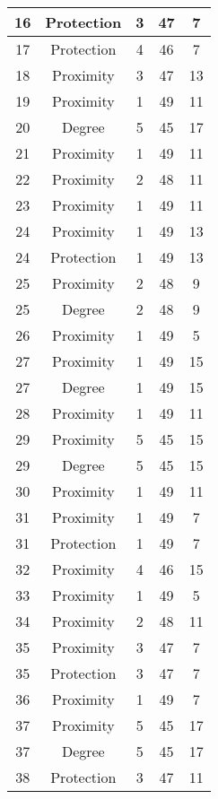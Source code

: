 \documentclass[results.tex]{subfiles}
\begin{document}
\begin{center}
\begin{tabular}{| c || c | c | c | c |}
    16 & Protection & 3 & 47 & 7 \\ 
    \hline
    17 & Protection & 4 & 46 & 7 \\ 
    \hline
    18 & Proximity & 3 & 47 & 13 \\ 
    \hline
    19 & Proximity & 1 & 49 & 11 \\ 
    \hline
    20 & Degree & 5 & 45 & 17 \\ 
    \hline
    21 & Proximity & 1 & 49 & 11 \\ 
    \hline
    22 & Proximity & 2 & 48 & 11 \\ 
    \hline
    23 & Proximity & 1 & 49 & 11 \\ 
    \hline
    24 & Proximity & 1 & 49 & 13 \\ 
    \hline
    24 & Protection & 1 & 49 & 13 \\ 
    \hline
    25 & Proximity & 2 & 48 & 9 \\ 
    \hline
    25 & Degree & 2 & 48 & 9 \\ 
    \hline
    26 & Proximity & 1 & 49 & 5 \\ 
    \hline
    27 & Proximity & 1 & 49 & 15 \\ 
    \hline
    27 & Degree & 1 & 49 & 15 \\ 
    \hline
    28 & Proximity & 1 & 49 & 11 \\ 
    \hline
    29 & Proximity & 5 & 45 & 15 \\ 
    \hline
    29 & Degree & 5 & 45 & 15 \\ 
    \hline
    30 & Proximity & 1 & 49 & 11 \\ 
    \hline
    31 & Proximity & 1 & 49 & 7 \\ 
    \hline
    31 & Protection & 1 & 49 & 7 \\ 
    \hline
    32 & Proximity & 4 & 46 & 15 \\ 
    \hline
    33 & Proximity & 1 & 49 & 5 \\ 
    \hline
    34 & Proximity & 2 & 48 & 11 \\ 
    \hline
    35 & Proximity & 3 & 47 & 7 \\ 
    \hline
    35 & Protection & 3 & 47 & 7 \\ 
    \hline
    36 & Proximity & 1 & 49 & 7 \\ 
    \hline
    37 & Proximity & 5 & 45 & 17 \\ 
    \hline
    37 & Degree & 5 & 45 & 17 \\ 
    \hline
    38 & Protection & 3 & 47 & 11 \\ 

\end{tabular}
\end{center}
\end{document}
